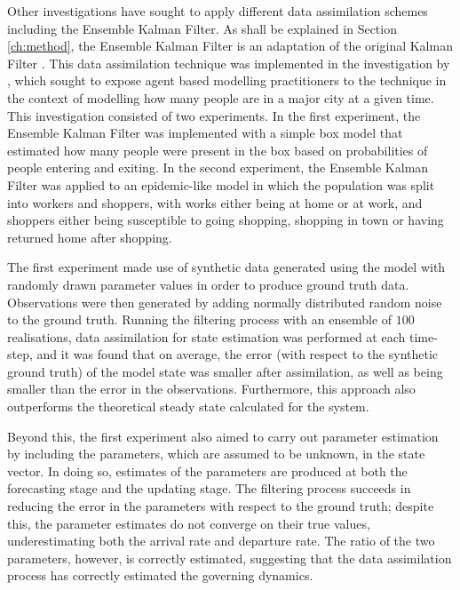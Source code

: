 Other investigations have sought to apply different data assimilation schemes
including the Ensemble Kalman Filter.
As shall be explained in Section \ref{ch:method}, the Ensemble Kalman Filter is an
adaptation of the original Kalman Filter \citep{evensen2003ensemble}.
This data assimilation technique was implemented in the investigation by
\citet{ward2016dynamic}, which sought to expose agent based modelling
practitioners to the technique in the context of modelling how many people are
in a major city at a given time.
This investigation consisted of two experiments.
In the first experiment, the Ensemble Kalman Filter was implemented with a
simple box model that estimated how many people were present in the box based on
probabilities of people entering and exiting.
In the second experiment, the Ensemble Kalman Filter was applied to an
epidemic-like model in which the population was split into workers and shoppers,
with works either being at home or at work, and shoppers either being
susceptible to going shopping, shopping in town or having returned home after
shopping.

The first experiment made use of synthetic data generated using the model with
randomly drawn parameter values in order to produce ground truth data.
Observations were then generated by adding normally distributed random noise to the
ground truth.
Running the filtering process with an ensemble of $100$ realisations, data
assimilation for state estimation was performed at each time-step, and it was
found that on average, the error (with respect to the synthetic ground truth) of
the model state was smaller after assimilation, as well as being smaller than
the error in the observations.
Furthermore, this approach also outperforms the theoretical steady state
calculated for the system.

Beyond this, the first experiment also aimed to carry out parameter estimation
by including the parameters, which are assumed to be unknown, in the state vector.
In doing so, estimates of the parameters are produced at both the forecasting
stage and the updating stage.
The filtering process succeeds in reducing the error in the parameters with
respect to the ground truth; despite this, the parameter estimates do not
converge on their true values, underestimating both the arrival rate and
departure rate.
The ratio of the two parameters, however, is correctly estimated, suggesting
that the data assimilation process has correctly estimated the governing
dynamics.

